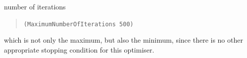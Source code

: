 \documentclass[]{report}
\begin{document}
number of iterations
\begin{quote}
\texttt{(MaximumNumberOfIterations 500)}
\end{quote}
which is not only the maximum, but also the minimum, since there is
no other appropriate stopping condition for this optimiser.

\begin{figure}
\centering
{}\label{sfig:stepsize:fixed}
\label{sfig:stepsize:moving} \\
\label{sfig:stepsize:a320}
\label{sfig:stepsize:a3200}
\label{sfig:stepsize:a32000}

\end{figure}
\end{document}
